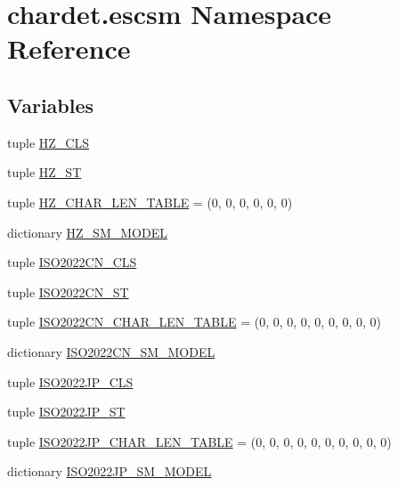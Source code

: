 \hypertarget{namespacechardet_1_1escsm}{}\section{chardet.\+escsm Namespace Reference}
\label{namespacechardet_1_1escsm}
\subsection*{Variables}
\begin{DoxyCompactItemize}
\item 
tuple \hyperlink{namespacechardet_1_1escsm_a7badc82cf8618a1c3f77368e235dabcf}{H\+Z\+\_\+\+C\+LS}
\item 
tuple \hyperlink{namespacechardet_1_1escsm_a146ce5619a41f2f42a08c2ca5fca9cd1}{H\+Z\+\_\+\+ST}
\item 
tuple \hyperlink{namespacechardet_1_1escsm_a938743b217528afdf3c0aceb5db9179a}{H\+Z\+\_\+\+C\+H\+A\+R\+\_\+\+L\+E\+N\+\_\+\+T\+A\+B\+LE} = (0, 0, 0, 0, 0, 0)
\item 
dictionary \hyperlink{namespacechardet_1_1escsm_a1fb2911c09ab6c5c5a131d341812cd31}{H\+Z\+\_\+\+S\+M\+\_\+\+M\+O\+D\+EL}
\item 
tuple \hyperlink{namespacechardet_1_1escsm_a5c5e3dadf36c1a89eb2a970acc25160c}{I\+S\+O2022\+C\+N\+\_\+\+C\+LS}
\item 
tuple \hyperlink{namespacechardet_1_1escsm_a328edfc3dc32929d2e9600255340b945}{I\+S\+O2022\+C\+N\+\_\+\+ST}
\item 
tuple \hyperlink{namespacechardet_1_1escsm_a26665cea8461b3c6ba10d9430887c654}{I\+S\+O2022\+C\+N\+\_\+\+C\+H\+A\+R\+\_\+\+L\+E\+N\+\_\+\+T\+A\+B\+LE} = (0, 0, 0, 0, 0, 0, 0, 0, 0)
\item 
dictionary \hyperlink{namespacechardet_1_1escsm_a98919247b6ea84f408a1659b3e2fbdd3}{I\+S\+O2022\+C\+N\+\_\+\+S\+M\+\_\+\+M\+O\+D\+EL}
\item 
tuple \hyperlink{namespacechardet_1_1escsm_aa712f4d349e6c1c841cde772cb736aac}{I\+S\+O2022\+J\+P\+\_\+\+C\+LS}
\item 
tuple \hyperlink{namespacechardet_1_1escsm_a97ec30e213ef7aa67d3ec142c44d7ef5}{I\+S\+O2022\+J\+P\+\_\+\+ST}
\item 
tuple \hyperlink{namespacechardet_1_1escsm_a8789f7f61337d9c581a62633bc119e61}{I\+S\+O2022\+J\+P\+\_\+\+C\+H\+A\+R\+\_\+\+L\+E\+N\+\_\+\+T\+A\+B\+LE} = (0, 0, 0, 0, 0, 0, 0, 0, 0, 0)
\item 
dictionary \hyperlink{namespacechardet_1_1escsm_ab8bfcef1bc43435b898e23879d2ee757}{I\+S\+O2022\+J\+P\+\_\+\+S\+M\+\_\+\+M\+O\+D\+EL}

\end{DoxyCompactItemize}
